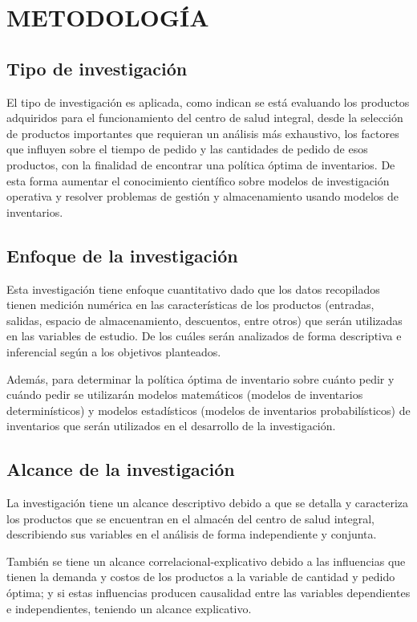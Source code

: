 \newpage
\chapter{METODOLOGÍA}
\section{Tipo de investigación}
El tipo de investigación es aplicada, como indican \cite{hernandez2020metodologia} se está evaluando los productos adquiridos para el funcionamiento del centro de salud integral, desde la selección de productos importantes que requieran un análisis más exhaustivo, los factores que influyen sobre el tiempo de pedido y las cantidades de pedido de esos productos, con la finalidad de encontrar una política óptima de inventarios. De esta forma aumentar el conocimiento científico sobre modelos de investigación operativa y resolver problemas de gestión y almacenamiento usando modelos de inventarios. 

\section{Enfoque de la investigación}
Esta investigación tiene enfoque cuantitativo dado que los datos recopilados tienen medición numérica en las características de los productos (entradas, salidas, espacio de almacenamiento, descuentos, entre otros) que serán utilizadas en las variables de estudio. De los cuáles serán analizados de forma descriptiva e inferencial según a los objetivos planteados. 

Además, para determinar la política óptima de inventario sobre cuánto pedir y cuándo pedir se utilizarán modelos matemáticos (modelos de inventarios determinísticos) y modelos estadísticos (modelos de inventarios probabilísticos) de inventarios que serán utilizados en el desarrollo de la investigación. \citep{hernandez2020metodologia}

\section{Alcance de la investigación}
La investigación tiene un alcance descriptivo debido a que se detalla y caracteriza los productos que se encuentran en el almacén del centro de salud integral, describiendo sus variables en el análisis de forma independiente y conjunta.

También se tiene un alcance correlacional-explicativo debido a las influencias que tienen la demanda y costos de los productos a la variable de cantidad y pedido óptima; y si estas influencias producen causalidad entre las variables dependientes e independientes, teniendo un alcance explicativo.

